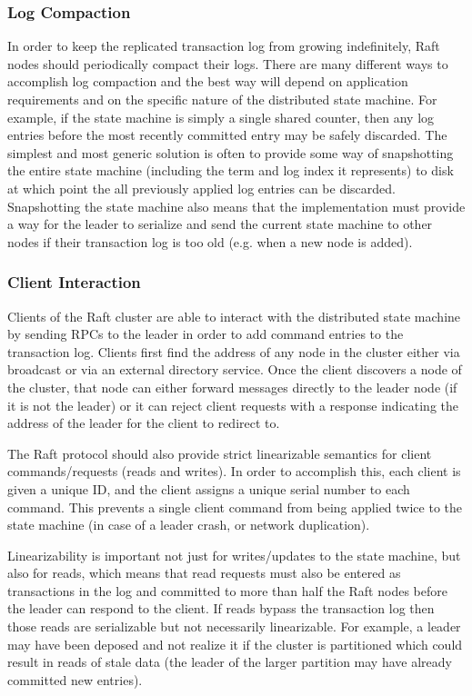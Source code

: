 \documentclass[9pt]{extarticle}
\begin{document}
\begin{multicols}{2}
\subsubsection{Log Compaction}

In order to keep the replicated transaction log from growing
indefinitely, Raft nodes should periodically compact their logs. There
are many different ways to accomplish log compaction and the best way
will depend on application requirements and on the specific nature of
the distributed state machine. For example, if the state machine is
simply a single shared counter, then any log entries before the most
recently committed entry may be safely discarded. The simplest and
most generic solution is often to provide some way of snapshotting the
entire state machine (including the term and log index it represents)
to disk at which point the all previously applied log entries can be
discarded. Snapshotting the state machine also means that the
implementation must provide a way for the leader to serialize and send
the current state machine to other nodes if their transaction log is
too old (e.g. when a new node is added).

\subsubsection{Client Interaction}

Clients of the Raft cluster are able to interact with the distributed
state machine by sending RPCs to the leader in order to add command
entries to the transaction log. Clients first find the address of any
node in the cluster either via broadcast or via an external directory
service. Once the client discovers a node of the cluster, that node
can either forward messages directly to the leader node (if it is not
the leader) or it can reject client requests with a response
indicating the address of the leader for the client to redirect to.

The Raft protocol should also provide strict linearizable semantics for
client commands/requests (reads and writes). In order to accomplish
this, each client is given a unique ID, and the client assigns
a unique serial number to each command. This prevents a single client
command from being applied twice to the state machine (in case of
a leader crash, or network duplication).

Linearizability is important not just for writes/updates to the state
machine, but also for reads, which means that read requests must also
be entered as transactions in the log and committed to more than half
the Raft nodes before the leader can respond to the client. If reads
bypass the transaction log then those reads are serializable but not
necessarily linearizable. For example, a leader may have been deposed
and not realize it if the cluster is partitioned which could result in
reads of stale data (the leader of the larger partition may have
already committed new entries).


\end{multicols}
\end{document}
